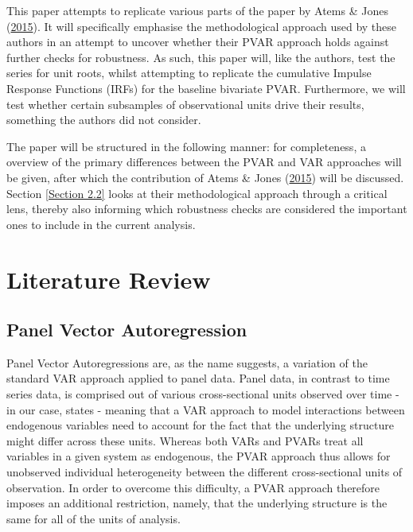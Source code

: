 \documentclass[11pt,preprint, authoryear]{elsarticle}
\numberwithin{equation}{section}
\numberwithin{figure}{section}
\numberwithin{table}{section}
\begin{document}
This paper attempts to replicate various parts of the paper by Atems \&
Jones (\protect\hyperlink{ref-atems}{2015}). It will specifically
emphasise the methodological approach used by these authors in an
attempt to uncover whether their PVAR approach holds against further
checks for robustness. As such, this paper will, like the authors, test
the series for unit roots, whilst attempting to replicate the cumulative
Impulse Response Functions (IRFs) for the baseline bivariate PVAR.
Furthermore, we will test whether certain subsamples of observational
units drive their results, something the authors did not consider.

The paper will be structured in the following manner: for completeness,
a overview of the primary differences between the PVAR and VAR
approaches will be given, after which the contribution of Atems \& Jones
(\protect\hyperlink{ref-atems}{2015}) will be discussed. Section
\ref{Section 2.2} looks at their methodological approach through a
critical lens, thereby also informing which robustness checks are
considered the important ones to include in the current analysis.

\newpage

\hypertarget{literature-review}{%
\section{\texorpdfstring{Literature Review
\label{Section 2}}{Literature Review }}\label{literature-review}}

\hypertarget{panel-vector-autoregression}{%
\subsection{\texorpdfstring{Panel Vector Autoregression
\label{Section 2.1}}{Panel Vector Autoregression }}\label{panel-vector-autoregression}}

Panel Vector Autoregressions are, as the name suggests, a variation of
the standard VAR approach applied to panel data. Panel data, in contrast
to time series data, is comprised out of various cross-sectional units
observed over time - in our case, states - meaning that a VAR approach
to model interactions between endogenous variables need to account for
the fact that the underlying structure might differ across these units.
Whereas both VARs and PVARs treat all variables in a given system as
endogenous, the PVAR approach thus allows for unobserved individual
heterogeneity between the different cross-sectional units of
observation. In order to overcome this difficulty, a PVAR approach
therefore imposes an additional restriction, namely, that the underlying
structure is the same for all of the units of analysis.
\end{document}
